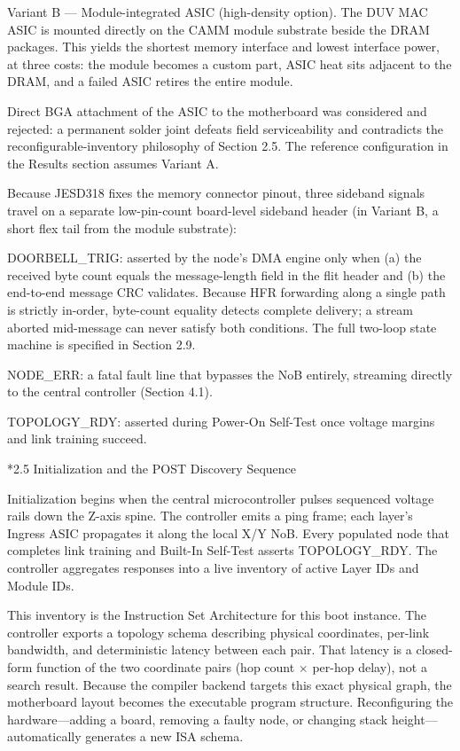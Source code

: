 \documentclass[12pt]{article}
\makeatletter
\renewcommand\subsection{\@startsection{subsection}{2}{\z@}{-1.0ex \@plus -0.2ex}{0.3ex}{\normalsize\bfseries}}
\makeatother
\begin{document}
Variant B --- Module-integrated ASIC (high-density option). The DUV MAC ASIC is mounted directly on the CAMM module substrate beside the DRAM packages. This yields the shortest memory interface and lowest interface power, at three costs: the module becomes a custom part, ASIC heat sits adjacent to the DRAM, and a failed ASIC retires the entire module.

Direct BGA attachment of the ASIC to the motherboard was considered and rejected: a permanent solder joint defeats field serviceability and contradicts the reconfigurable-inventory philosophy of Section 2.5. The reference configuration in the Results section assumes Variant A.

Because JESD318 fixes the memory connector pinout, three sideband signals travel on a separate low-pin-count board-level sideband header (in Variant B, a short flex tail from the module substrate):

DOORBELL\_TRIG: asserted by the node's DMA engine only when (a) the received byte count equals the message-length field in the flit header and (b) the end-to-end message CRC validates. Because HFR forwarding along a single path is strictly in-order, byte-count equality detects complete delivery; a stream aborted mid-message can never satisfy both conditions. The full two-loop state machine is specified in Section 2.9.

NODE\_ERR: a fatal fault line that bypasses the NoB entirely, streaming directly to the central controller (Section 4.1).

TOPOLOGY\_RDY: asserted during Power-On Self-Test once voltage margins and link training succeed.

\subsection*{2.5 Initialization and the POST Discovery Sequence}

Initialization begins when the central microcontroller pulses sequenced voltage rails down the Z-axis spine. The controller emits a ping frame; each layer's Ingress ASIC propagates it along the local X/Y NoB. Every populated node that completes link training and Built-In Self-Test asserts TOPOLOGY\_RDY. The controller aggregates responses into a live inventory of active Layer IDs and Module IDs.

This inventory is the Instruction Set Architecture for this boot instance. The controller exports a topology schema describing physical coordinates, per-link bandwidth, and deterministic latency between each pair. That latency is a closed-form function of the two coordinate pairs (hop count $\times$ per-hop delay), not a search result. Because the compiler backend targets this exact physical graph, the motherboard layout becomes the executable program structure. Reconfiguring the hardware---adding a board, removing a faulty node, or changing stack height---automatically generates a new ISA schema.
\end{document}
